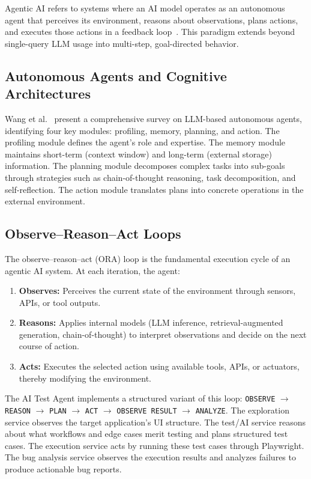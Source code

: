Agentic AI refers to systems where an AI model operates as an
autonomous agent that perceives its environment, reasons about
observations, plans actions, and executes those actions in a feedback
loop~\cite{yang2023agentic, wang2024survey}. This paradigm extends
beyond single-query LLM usage into multi-step, goal-directed behavior.

\subsection{Autonomous Agents and Cognitive Architectures}
\label{subsec:autonomous_agents}

Wang et al.~\cite{wang2024survey} present a comprehensive survey on
LLM-based autonomous agents, identifying four key modules: profiling,
memory, planning, and action. The profiling module defines the agent's
role and expertise. The memory module maintains short-term (context
window) and long-term (external storage) information. The planning
module decomposes complex tasks into sub-goals through strategies such
as chain-of-thought reasoning, task decomposition, and self-reflection.
The action module translates plans into concrete operations in the
external environment.

\subsection{Observe--Reason--Act Loops}
\label{subsec:ora_loop}

The observe--reason--act (ORA) loop is the fundamental execution cycle
of an agentic AI system. At each iteration, the agent:

\begin{enumerate}[nosep]
  \item \textbf{Observes:} Perceives the current state of the
        environment through sensors, APIs, or tool outputs.
  \item \textbf{Reasons:} Applies internal models (LLM inference,
        retrieval-augmented generation, chain-of-thought) to interpret
        observations and decide on the next course of action.
  \item \textbf{Acts:} Executes the selected action using available
        tools, APIs, or actuators, thereby modifying the environment.
\end{enumerate}

The AI Test Agent implements a structured variant of this loop:
\texttt{OBSERVE} $\rightarrow$ \texttt{REASON} $\rightarrow$
\texttt{PLAN} $\rightarrow$ \texttt{ACT} $\rightarrow$
\texttt{OBSERVE~RESULT} $\rightarrow$ \texttt{ANALYZE}. The
exploration service observes the target application's UI structure.
The test/AI service reasons about what workflows and edge cases
merit testing and plans structured test cases. The execution service
acts by running these test cases through Playwright. The bug analysis
service observes the execution results and analyzes failures to
produce actionable bug reports.

